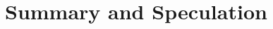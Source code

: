 \documentclass[useAMS,usenatbib]{mn2e}
\begin{document}
\newcommand\fakesc[1]{\protect\scalebox{1.0}[0.8]{#1}}
\newcommand\ION[2]{\ensuremath{\mathrm{#1\,\fakesc{#2}}}}
\newcommand\ion[2]{\setcounter{ion}{#2}\ION{#1}{\Roman{ion}}}
\newcommand\hii{\ion{H}{2}}
\newcommand\oi{[\ion{O}{1}]}
\newcommand\oiii{[\ion{O}{3}]}
\newcommand\nii{[\ion{N}{2}]}
\newcommand\sii{[\ion{S}{2}]}
\newcommand\siii{[\ion{S}{3}]}
\newcommand\ha{\ensuremath{\mathrm{H\alpha}}}
\newcommand\kms{\ensuremath{\mathrm{km\ s^{-1}}}}
\newcommand\los{\ensuremath{_{\mathrm{los}}}}
\newcommand\pos{\ensuremath{_{\mathrm{pos}}}}
\newcommand\obs{\ensuremath{_{\mathrm{obs}}}}
\newcommand\ins{\ensuremath{_{\mathrm{ins}}}}
\newcommand\rms{\ensuremath{_{\mathrm{rms}}}}
\newcommand\FS{\ensuremath{_{\mathrm{fs}}}}
\newcommand\therm{\ensuremath{_{\mathrm{therm}}}}

\newcommand\Efrac{\ensuremath{_{\scriptscriptstyle E/E_0}}}
\newcommand\denfrac{\ensuremath{_{\scriptscriptstyle \rho/\rho_0}}}
\newcommand\lnSfrac{\ensuremath{_{\scriptscriptstyle \ln S/S_0}}}
\newcommand\Sfrac{\ensuremath{_{\scriptscriptstyle S/S_0}}}


\addtocounter{section}{5}

\section{Summary and Speculation}
\label{sec:summary-conclusions}
\end{document}
